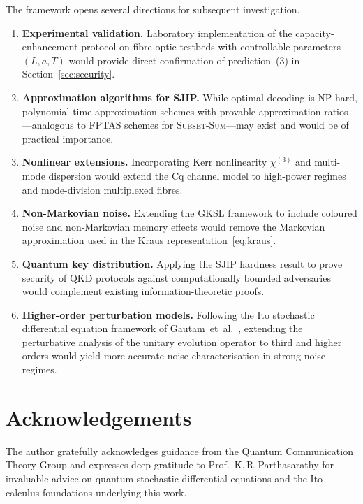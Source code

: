 \documentclass[journal,twocolumn]{IEEEtran}
\theoremstyle{definition}
\theoremstyle{plain}
\begin{document}
The framework opens several directions for subsequent investigation.

\begin{enumerate}[leftmargin=*, label=(\arabic*), itemsep=2pt]
  \item \textbf{Experimental validation.}  Laboratory implementation
    of the capacity-enhancement protocol on fibre-optic testbeds
    with controllable parameters $(L, a, T)$ would provide direct
    confirmation of prediction~(3) in Section~\ref{sec:security}.

  \item \textbf{Approximation algorithms for SJIP.}  While optimal
    decoding is NP-hard, polynomial-time approximation schemes with
    provable approximation ratios---analogous to FPTAS schemes for
    \textsc{Subset-Sum}---may exist and would be of practical
    importance.

  \item \textbf{Nonlinear extensions.}  Incorporating Kerr
    nonlinearity $\chi^{(3)}$ and multi-mode dispersion would
    extend the Cq channel model to high-power regimes and
    mode-division multiplexed fibres.

  \item \textbf{Non-Markovian noise.}  Extending the GKSL framework
    to include coloured noise and non-Markovian memory effects would
    remove the Markovian approximation used in the Kraus
    representation~\eqref{eq:kraus}.

  \item \textbf{Quantum key distribution.}  Applying the
    SJIP hardness result to prove security of QKD protocols against
    computationally bounded adversaries would complement existing
    information-theoretic proofs.

  \item \textbf{Higher-order perturbation models.}  Following
    the Ito stochastic differential equation framework of
    Gautam~et~al.~\cite{gautam2015a}, extending the perturbative
    analysis of the unitary evolution operator to third and higher
    orders would yield more accurate noise characterisation in
    strong-noise regimes.
\end{enumerate}

\section*{Acknowledgements}

The author gratefully acknowledges guidance from the Quantum
Communication Theory Group and expresses deep gratitude to
Prof.~K.\,R.\,Parthasarathy for invaluable advice on quantum
stochastic differential equations and the Ito calculus foundations
underlying this work.
\end{document}
